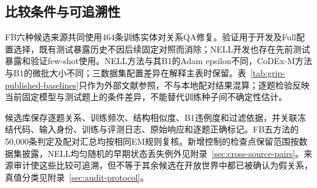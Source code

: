 \subsection{比较条件与可追溯性}

FB六种候选来源共同使用464条训练实体对关系QA修复。验证用于开发及Full配置选择，既有测试暴露历史不因后续固定对照而消除；NELL开发也存在先前测试暴露和验证few-shot使用。NELL方法与其B1的Adam epsilon不同，CoDEx-M方法与B1的微批大小不同；三数据集配置差异在解释主表时保留。表~\ref{tab:grip-published-baselines}只作为外部文献参照，不与本地配对结果混算；逐题检验反映当前固定模型与测试题上的条件差异，不能替代训练种子间不确定性估计。

候选库保存逐题关系、训练频次、结构相似度、B1违例度和过滤依据，并关联冻结代码、输入身份、训练与评测日志、原始响应和逐题正确标记。FB五方法的50,000条判定及配对汇总均按相同EM规则复核。新增控制的检查点保留范围按数据集披露，NELL均匀随机的早期状态丢失例外见附录~\ref{sec:cross-source-pairs}。来源审计使这些比较可追溯，但不等于其余候选在开放世界中都已被确认为假关系，真值分类见附录~\ref{sec:audit-protocol}。
